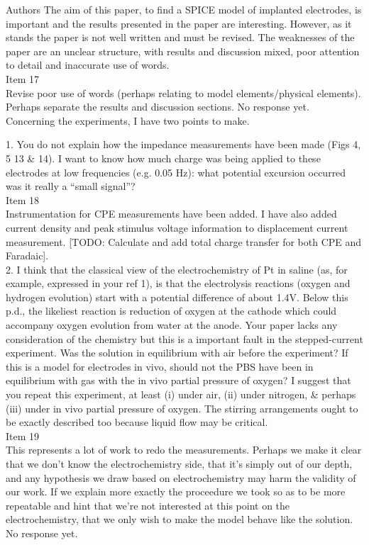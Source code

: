 \documentclass[journal, a4paper]{IEEEtran}
\begin{document}
{\color{blue}
Authors
The aim of this paper, to find a SPICE model of implanted electrodes, is important and the results presented in the paper are interesting. However, as it stands the paper is not well written and must be revised. The weaknesses of the paper are an unclear structure, with results and discussion mixed, poor attention to detail and inaccurate use of words.\\
{\color{OliveGreen}
    Item 17\\
    {\color{Red} Revise poor use of words (perhaps relating to model elements/physical elements). Perhaps separate the results and discussion sections.} 
    No response yet.
}\\

Concerning the experiments, I have two points to make.

1. You do not explain how the impedance measurements have been made (Figs 4, 5 13 \& 14). I want to know how much charge was being applied to these electrodes at low frequencies (e.g. 0.05 Hz): what potential excursion occurred was it really a ``small signal''?\\
{\color{OliveGreen}
    Item 18\\
    Instrumentation for CPE measurements have been added. I have also added current density and peak stimulus voltage information to displacement current measurement. [TODO: Calculate and add total charge transfer for both CPE and Faradaic].
}\\

2. I think that the classical view of the electrochemistry of Pt in saline (as, for example, expressed in your ref 1), is that the electrolysis reactions (oxygen and hydrogen evolution) start with a potential difference of about 1.4V. Below this p.d., the likeliest reaction is reduction of oxygen at the cathode which could accompany oxygen evolution from water at the anode. Your paper lacks any consideration of the chemistry but this is a important fault in the stepped-current experiment. Was the solution in equilibrium with air before the experiment? If this is a model for electrodes in vivo, should not the PBS have been in equilibrium with gas with the in vivo partial pressure of oxygen? I suggest that you repeat this experiment, at least (i) under air, (ii) under nitrogen, \& perhaps (iii) under in vivo partial pressure of oxygen. The stirring arrangements ought to be exactly described too because liquid flow may be critical.\\
{\color{OliveGreen}
    Item 19\\
    {\color{Red} This represents a lot of work to redo the measurements. Perhaps we make it clear that we don't know the electrochemistry side, that it's simply out of our depth, and any hypothesis we draw based on electrochemistry may harm the validity of our work. If we explain more exactly the proceedure we took so as to be more repeatable and hint that we're not interested at this point on the electrochemistry, that we only wish to make the model behave like the solution.}
    No response yet.
}

}
\end{document}
